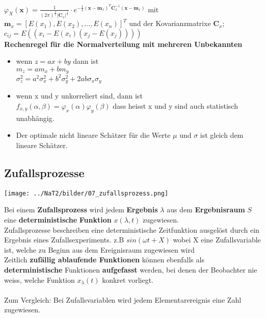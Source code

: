 			$\varphi_X(\textbf{x})=\frac{1}{(2\pi)^{\frac{n}{2}}|\textbf{C}_x|^{\frac{1}{2}}}\cdot 
			e^{-\frac{1}{2}(\textbf{x} - \textbf{m}_x)^T \textbf{C}_x^{-1} (\textbf{x} - \textbf{m}_x)}$ mit \\
			$\textbf{m}_x=[E(x_1), E(x_2), \ldots, E(x_n)]^T$ und der Kovarianzmatrixe $\textbf{C}_x$; $c_{ij} = E((x_i-E(x_i)(x_j-E(x_j))))$ \\
		\textbf{Rechenregel für die Normalverteilung mit mehreren Unbekannten}
		\begin{itemize}
		  \item wenn $z=a x + b y$ dann ist \\
		  $m_z =  a m_x + b m_y$\\
		  $\sigma_z^2 = a^2\sigma_x^2 + b^2\sigma_y^2+2ab\sigma_x\sigma_y$
		  \item wenn x und y unkorreliert sind, dann ist \\
		  		$f_{x,y}(\alpha, \beta) = \varphi_x(\alpha)\varphi_y(\beta)$ dass heisst x und y sind auch statistisch unabhängig.
		  \item Der optimale nicht lineare Schätzer für die Werte $\mu$ und $\sigma$ ist gleich dem lineare Schätzer.
		\end{itemize}
   		
 
        
        
        
\subsection{Zufallsprozesse}
\begin{minipage}{10.3cm}
	\texttt{[image: ../NaT2/bilder/07\_zufallsprozess.png]}
\end{minipage}
\begin{minipage}{8.5cm}
	Bei einem \textbf{Zufallsprozess} wird jedem \textbf{Ergebnis} \boldmath$\lambda$ aus 
	dem \textbf{Ergebnisraum} $S$ eine \textbf{deterministische} \textbf{Funktion} $x(\lambda, t)$
	\unboldmath zugewiesen. \\
	Zufallsprozesse beschreiben eine deterministische Zeitfunktion ausgelöst durch ein Ergebnis eines
	Zufallsexperiments. z.B $sin(\omega t + X)$ wobei X eine Zufallsvariable ist, welche zu Beginn aus dem Ereignisraum zugewiesen wird\\
	Zeitlich \textbf{zufällig ablaufende Funktionen} können ebenfalls als \textbf{deterministische} Funktionen 
	\textbf{aufgefasst} werden, bei denen der Beobachter nie weiss, welche Funktion $x_\lambda(t)$ konkret
	vorliegt.	\\ \\
	Zum Vergleich: Bei Zufallsvariablen wird jedem Elementarereignis eine Zahl zugewiesen. 
\end{minipage} 
\vspace{0.5cm} \\


